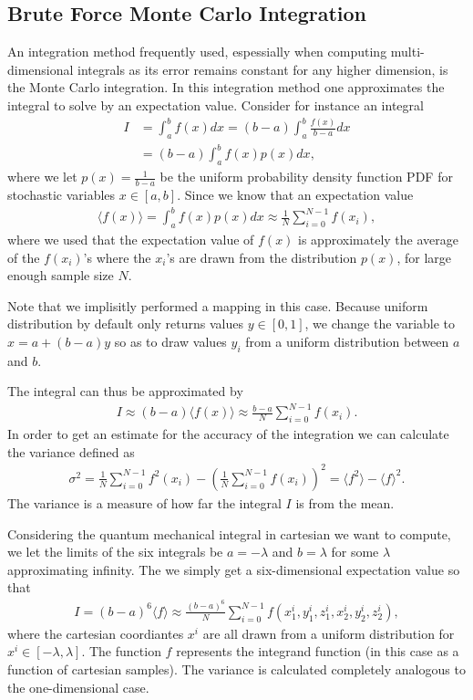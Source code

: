 \documentclass[twocolumn]{aastex62}
\begin{document}
\subsection{Brute Force Monte Carlo Integration}
An integration method frequently used, espessially when computing multi-dimensional integrals as its error remains constant for any higher dimension, is the Monte Carlo integration. In this integration method one approximates the integral to solve by an expectation value. Consider for instance an integral 
\begin{align}
	I &= \int^b_a f(x)dx = (b-a)\int^b_a\frac{f(x)}{b-a}dx \\	
	&= (b-a)\int^b_af(x)p(x)dx,
\end{align}
where we let $p(x) = \frac{1}{b-a}$ be the uniform probability density function PDF for stochastic variables $x\in[a, b]$. Since we know that an expectation value 
\begin{align}
	\langle f(x)\rangle = \int^b_a f(x)p(x)dx \approx \frac{1}{N}\sum_{i=0}^{N-1} f(x_i),
\end{align}
where we used that the expectation value of $f(x)$ is approximately the average of the $f(x_i)$'s where the $x_i$'s are drawn from the distribution $p(x)$, for large enough sample size $N$. 

Note that we implisitly performed a mapping in this case. Because uniform distribution by default only returns values $y\in[0, 1]$, we change the variable to $x = a + (b-a)y$ so as to draw values $y_i$ from a uniform distribution between $a$ and $b$. 

The integral can thus be approximated by 
\begin{align}
	I \approx (b-a)\langle f(x) \rangle \approx \frac{b-a}{N}\sum^{N-1}_{i=0}f(x_i).
\end{align}
In order to get an estimate for the accuracy of the integration we can calculate the variance defined as 
\begin{align}
	\sigma^2 = \frac{1}{N}\sum_{i=0}^{N-1} f^2(x_i) - \left(\frac{1}{N}\sum_{i=0}^{N-1}f(x_i)\right)^2 = \langle f^2\rangle - \langle f\rangle^2.
\end{align}
The variance is a measure of how far the integral $I$ is from the mean.

Considering the quantum mechanical integral in cartesian we want to compute, we let the limits of the six integrals be $a=-\lambda$ and $b=\lambda$ for some $\lambda$ approximating infinity. The we simply get a six-dimensional expectation value so that 
\begin{align}
	I = (b-a)^6\langle f \rangle \approx \frac{(b-a)^6}{N}\sum^{N-1}_{i=0} f(x_1^i, y_1^i, z_1^i, x_2^i, y_2^i, z_2^i),
\end{align}
where the cartesian coordiantes $x^i$ are all drawn from a uniform distribution for $x^i\in[-\lambda, \lambda]$. The function $f$ represents the integrand function (in this case as a function of cartesian samples). The variance is calculated completely analogous to the one-dimensional case. 
\end{document}
